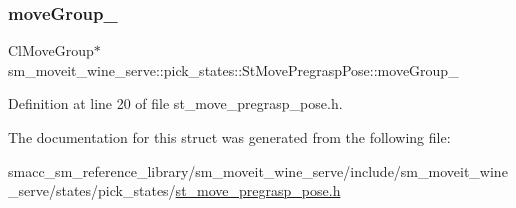 \subsubsection{\texorpdfstring{move\+Group\+\_\+}{moveGroup\_}}
{\footnotesize\ttfamily Cl\+Move\+Group$\ast$ sm\+\_\+moveit\+\_\+wine\+\_\+serve\+::pick\+\_\+states\+::\+St\+Move\+Pregrasp\+Pose\+::move\+Group\+\_\+}



Definition at line 20 of file st\+\_\+move\+\_\+pregrasp\+\_\+pose.\+h.



The documentation for this struct was generated from the following file\+:\begin{DoxyCompactItemize}
\item 
smacc\+\_\+sm\+\_\+reference\+\_\+library/sm\+\_\+moveit\+\_\+wine\+\_\+serve/include/sm\+\_\+moveit\+\_\+wine\+\_\+serve/states/pick\+\_\+states/\hyperlink{sm__moveit__wine__serve_2include_2sm__moveit__wine__serve_2states_2pick__states_2st__move__pregrasp__pose_8h}{st\+\_\+move\+\_\+pregrasp\+\_\+pose.\+h}\end{DoxyCompactItemize}
